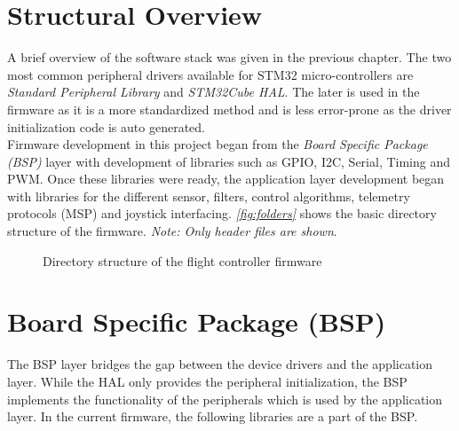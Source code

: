 \documentclass[a4paper,12pt,oneside]{book}
\begin{document}
\section{Structural Overview}
A brief overview of the software stack was given in the previous chapter. The two most common peripheral drivers available for STM32 micro-controllers are \textit{Standard Peripheral Library} and \textit{STM32Cube HAL}. The later is used in the firmware as it is a  more standardized method and is less error-prone as the driver initialization code is auto generated.\\

Firmware development in this project began from the \textit{Board Specific Package (BSP)} layer with development of libraries such as GPIO, I2C, Serial, Timing and PWM. Once these libraries were ready, the application layer development began with libraries for the different sensor, filters, control algorithms, telemetry protocols (MSP) and joystick interfacing. \textit{\autoref{fig:folders}} shows the basic directory  structure of the firmware. \textit{Note: Only  header files are shown}.\\

\begin{figure}[!htb]
\centering
{}
\caption{Directory structure of the flight controller firmware}
\label{fig:folders}
\end{figure}

\section{Board Specific Package (BSP)}
The BSP layer bridges the gap between the device drivers and the application layer. While the HAL only provides the peripheral initialization, the BSP implements the functionality of the peripherals which is used by the application layer. In the current firmware, the following libraries are a part of the BSP.\\
\end{document}
